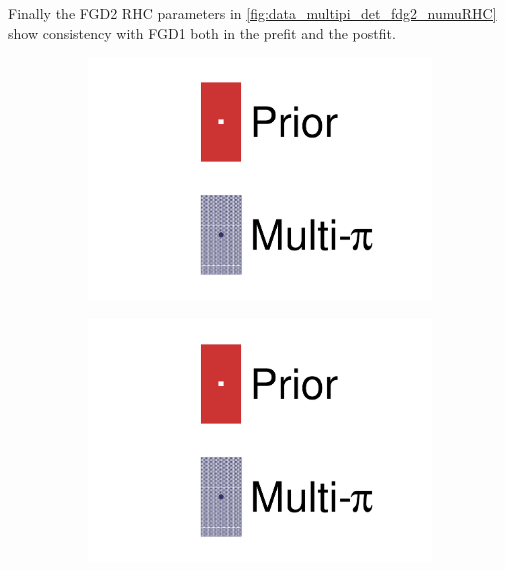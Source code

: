 Finally the FGD2 \numu RHC parameters in \autoref{fig:data_multipi_det_fdg2_numuRHC} show consistency with FGD1 both in the prefit and the postfit.
\begin{figure}[h]
	\centering
	\begin{subfigure}[t]{0.1\textwidth}
		\includegraphics[width=\textwidth,page=1, trim={0mm 120mm 40mm 20mm}, clip]{figures/mach3/2018/data/2018a_FixedCov_RedCov_Mpi_Data_merge_drawPar_withDet}
	\end{subfigure}
	\begin{subfigure}[t]{0.1\textwidth}
		\includegraphics[width=\textwidth,page=1, trim={0mm 20mm 40mm 120mm}, clip]{figures/mach3/2018/data/2018a_FixedCov_RedCov_Mpi_Data_merge_drawPar_withDet}
	\end{subfigure}


\end{figure}
